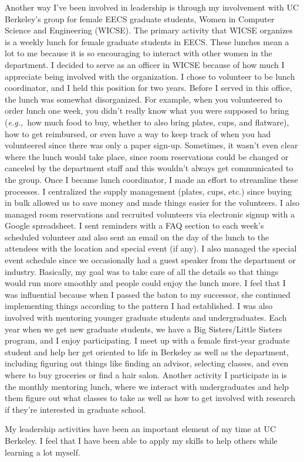 \documentclass{article}
\newcommand{\eg}{{\em e.g.,}~}
\begin{document}
Another way I've been involved in leadership is through my involvement with UC Berkeley's group for female EECS graduate students, Women in Computer Science and Engineering (WICSE).
The primary activity that WICSE organizes is a weekly lunch for female graduate students in EECS.
These lunches mean a lot to me because it is so encouraging to interact with other women in the department.
I decided to serve as an officer in WICSE because of how much I appreciate being involved with the organization.
I chose to volunteer to be lunch coordinator, and I held this position for two years.
Before I served in this office, the lunch was somewhat disorganized.
For example, when you volunteered to order lunch one week, you didn't really know what you were supposed to bring (\eg how much food to buy, whether to also bring plates, cups, and flatware), how to get reimbursed, or even have a way to keep track of when you had volunteered since there was only a paper sign-up.
Sometimes, it wasn't even clear where the lunch would take place, since room reservations could be changed or canceled by the department staff and this wouldn't always get communicated to the group.
Once I became lunch coordinator, I made an effort to streamline these processes.
I centralized the supply management (plates, cups, etc.) since buying in bulk allowed us to save money and made things easier for the volunteers.
I also managed room reservations and recruited volunteers via electronic signup with a Google spreadsheet.
I sent reminders with a FAQ section to each week's scheduled volunteer and also sent an email on the day of the lunch to the attendees with the location and special event (if any).
I also managed the special event schedule since we occasionally had a guest speaker from the department or industry.
Basically, my goal was to take care of all the details so that things would run more smoothly and people could enjoy the lunch more.
I feel that I was influential because when I passed the baton to my successor, she continued implementing things according to the pattern I had established.
I was also involved with mentoring younger graduate students and undergraduates.
Each year when we get new graduate students, we have a Big Sisters/Little Sisters program, and I enjoy participating.
I meet up with a female first-year graduate student and help her get oriented to life in Berkeley as well as the department, including figuring out things like finding an advisor, selecting classes, and even where to buy groceries or find a hair salon.
Another activity I participate in is the monthly mentoring lunch, where we interact with undergraduates and help them figure out what classes to take as well as how to get involved with research if they're interested in graduate school.

My leadership activities have been an important element of my time at UC Berkeley.
I feel that I have been able to apply my skills to help others while learning a lot myself.
\end{document}
